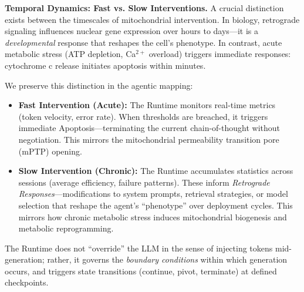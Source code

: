 \textbf{Temporal Dynamics: Fast vs. Slow Interventions.}
A crucial distinction exists between the timescales of mitochondrial intervention. In biology, retrograde signaling influences nuclear gene expression over hours to days---it is a \textit{developmental} response that reshapes the cell's phenotype. In contrast, acute metabolic stress (ATP depletion, Ca$^{2+}$ overload) triggers immediate responses: cytochrome c release initiates apoptosis within minutes.

We preserve this distinction in the agentic mapping:
\begin{itemize}[leftmargin=*]
\item \textbf{Fast Intervention (Acute):} The Runtime monitors real-time metrics (token velocity, error rate). When thresholds are breached, it triggers immediate Apoptosis---terminating the current chain-of-thought without negotiation. This mirrors the mitochondrial permeability transition pore (mPTP) opening.
\item \textbf{Slow Intervention (Chronic):} The Runtime accumulates statistics across sessions (average efficiency, failure patterns). These inform \textit{Retrograde Responses}---modifications to system prompts, retrieval strategies, or model selection that reshape the agent's ``phenotype'' over deployment cycles. This mirrors how chronic metabolic stress induces mitochondrial biogenesis and metabolic reprogramming.
\end{itemize}
The Runtime does not ``override'' the LLM in the sense of injecting tokens mid-generation; rather, it governs the \textit{boundary conditions} within which generation occurs, and triggers state transitions (continue, pivot, terminate) at defined checkpoints.
